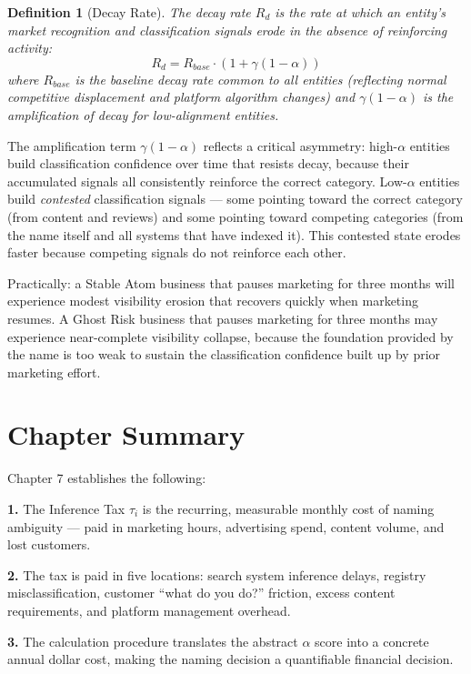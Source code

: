 \documentclass[12pt, openany]{book}
\theoremstyle{thmstyle}
\theoremstyle{defstyle}
\newtheorem{definition}{Definition}[chapter]
\newcommand{\taui}{\tau_i}
\begin{document}
\begin{definition}[Decay Rate]
The decay rate $R_d$ is the rate at which an entity's market recognition and classification signals erode in the absence of reinforcing activity:
\[
R_d = R_{base} \cdot (1 + \gamma(1-\alpha))
\]
where $R_{base}$ is the baseline decay rate common to all entities (reflecting normal competitive displacement and platform algorithm changes) and $\gamma(1-\alpha)$ is the amplification of decay for low-alignment entities.
\end{definition}

The amplification term $\gamma(1-\alpha)$ reflects a critical asymmetry: high-$\alpha$ entities build classification confidence over time that resists decay, because their accumulated signals all consistently reinforce the correct category. Low-$\alpha$ entities build \textit{contested} classification signals --- some pointing toward the correct category (from content and reviews) and some pointing toward competing categories (from the name itself and all systems that have indexed it). This contested state erodes faster because competing signals do not reinforce each other.

Practically: a Stable Atom business that pauses marketing for three months will experience modest visibility erosion that recovers quickly when marketing resumes. A Ghost Risk business that pauses marketing for three months may experience near-complete visibility collapse, because the foundation provided by the name is too weak to sustain the classification confidence built up by prior marketing effort.

\section{Chapter Summary}

Chapter 7 establishes the following:

\textbf{1.} The Inference Tax $\taui$ is the recurring, measurable monthly cost of naming ambiguity --- paid in marketing hours, advertising spend, content volume, and lost customers.

\textbf{2.} The tax is paid in five locations: search system inference delays, registry misclassification, customer ``what do you do?'' friction, excess content requirements, and platform management overhead.

\textbf{3.} The calculation procedure translates the abstract $\alpha$ score into a concrete annual dollar cost, making the naming decision a quantifiable financial decision.
\end{document}
